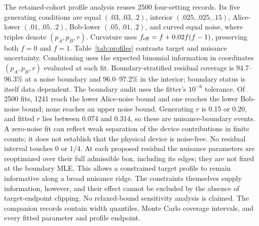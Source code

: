 The retained-cohort profile analysis reuses 2500 four-setting records. Its five
generating conditions are equal $(.03,.03,.2)$, interior $(.025,.025,.15)$,
Alice-lower $(.01,.05,.2)$, Bob-lower $(.05,.01,.2)$, and curved equal noise,
where triples denote $(p_A,p_B,r)$. Curvature uses
$f_{\rm eff}=f+0.02f(f-1)$, preserving both $f=0$ and $f=1$.
Table~\ref{tab:profiles} contrasts target and nuisance uncertainty. Conditioning
uses the expected binomial information in coordinates $(p_A,p_B,r)$ evaluated
at each fit. Boundary-stratified residual coverage is 94.7--96.3\% at a noise
boundary and 96.0--97.2\% in the interior; boundary status is itself data dependent.
The boundary audit uses the fitter's $10^{-6}$ tolerance. Of 2500 fits,
1241 reach the lower Alice-noise bound and one reaches the lower Bob-noise bound;
none reaches an upper noise bound. Generating $r$ is 0.15 or 0.20, and fitted
$r$ lies between 0.074 and 0.314, so these are nuisance-boundary events.
A zero-noise fit can reflect weak separation of the device contributions in
finite counts; it does not establish that the physical device is noise-free.
No residual interval touches 0 or $1/4$. At each proposed residual the nuisance
parameters are reoptimized over their full admissible box, including its edges;
they are not fixed at the boundary MLE. This allows a constrained target profile
to remain informative along a broad nuisance ridge. The constraints themselves
supply information, however, and their effect cannot be excluded by the absence
of target-endpoint clipping. No relaxed-bound sensitivity analysis is claimed.
The companion records contain width quantiles, Monte Carlo coverage intervals,
and every fitted parameter and profile endpoint.

